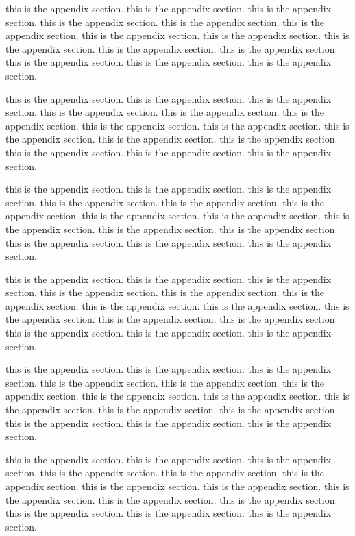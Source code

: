 this is the appendix section. this is the appendix section. this is the appendix section. this is the appendix section. this is the appendix section. this is the appendix section. this is the appendix section. this is the appendix section. this is the appendix section. this is the appendix section. this is the appendix section. this is the appendix section. this is the appendix section. this is the appendix section.

this is the appendix section. this is the appendix section. this is the appendix section. this is the appendix section. this is the appendix section. this is the appendix section. this is the appendix section. this is the appendix section. this is the appendix section. this is the appendix section. this is the appendix section. this is the appendix section. this is the appendix section. this is the appendix section.

this is the appendix section. this is the appendix section. this is the appendix section. this is the appendix section. this is the appendix section. this is the appendix section. this is the appendix section. this is the appendix section. this is the appendix section. this is the appendix section. this is the appendix section. this is the appendix section. this is the appendix section. this is the appendix section.

this is the appendix section. this is the appendix section. this is the appendix section. this is the appendix section. this is the appendix section. this is the appendix section. this is the appendix section. this is the appendix section. this is the appendix section. this is the appendix section. this is the appendix section. this is the appendix section. this is the appendix section. this is the appendix section.

this is the appendix section. this is the appendix section. this is the appendix section. this is the appendix section. this is the appendix section. this is the appendix section. this is the appendix section. this is the appendix section. this is the appendix section. this is the appendix section. this is the appendix section. this is the appendix section. this is the appendix section. this is the appendix section.

this is the appendix section. this is the appendix section. this is the appendix section. this is the appendix section. this is the appendix section. this is the appendix section. this is the appendix section. this is the appendix section. this is the appendix section. this is the appendix section. this is the appendix section. this is the appendix section. this is the appendix section. this is the appendix section.

